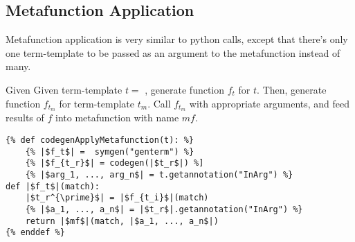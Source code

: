 \subsection{Metafunction Application}
Metafunction application is very similar to python calls, except that there's only one term-template to be passed as an argument to the metafunction instead of many.

Given Given term-template $t=$ \ApplyMetafunction, generate function $f_t$ for $t$. Then, generate function $f_{t_m}$ for term-template $t_m$. Call $f_{t_m}$ with appropriate arguments, and feed results of $f$ into metafunction with name $mf$.

\begin{verbatim}
{% def codegenApplyMetafunction(t): %}
	{% |$f_t$| =  symgen("genterm") %}
	{% |$f_{t_r}$| = codegen(|$t_r$|) %]
	{% |$arg_1, ..., arg_n$| = t.getannotation("InArg") %}
def |$f_t$|(match):
	|$t_r^{\prime}$| = |$f_{t_i}$|(match)
	{% |$a_1, ..., a_n$| = |$t_r$|.getannotation("InArg") %}
	return |$mf$|(match, |$a_1, ..., a_n$|) 
{% enddef %}
\end{verbatim}

